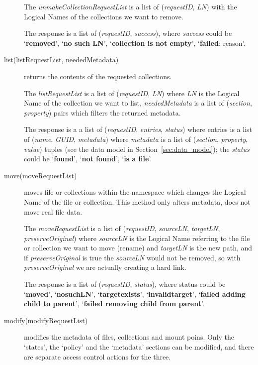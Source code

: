 \documentclass{book}
\begin{document}
\begin{description}
    The \emph{unmakeCollectionRequestList} is a list of (\emph{requestID}, \emph{LN}) with the Logical Names of the collections we want to remove. 

    The response is a list of (\emph{requestID}, \emph{success}), where \emph{success} could be `\textbf{removed}', `\textbf{no such LN}', `\textbf{collection is not empty}', `\textbf{failed}: reason'.
    
    \item[list(listRequestList, neededMetadata)] returns the contents of the requested collections.
        
    The \emph{listRequestList} is a list of (\emph{requestID}, \emph{LN}) where \emph{LN} is the Logical Name of the collection we want to list, \emph{neededMetadata} is a list of (\emph{section}, \emph{property}) pairs which filters the returned metadata.
    
    The response is a a list of (\emph{requestID}, \emph{entries}, \emph{status}) where entries is a list of (\emph{name}, \emph{GUID}, \emph{metadata}) where \emph{metadata} is a list of (\emph{section}, \emph{property}, \emph{value}) tuples (see the data model in Section~\ref{sec:data_model}); the \emph{status} could be `\textbf{found}', `\textbf{not found}', `\textbf{is a file}'.
    
    \item[move(moveRequestList)] moves file or collections within the namespace which changes the Logical Name of the file or collection. This method only alters metadata, does not move real file data.

    The \emph{moveRequestList} is a list of (\emph{requestID}, \emph{sourceLN}, \emph{targetLN}, \emph{preserveOriginal}) where \emph{sourceLN} is the Logical Name referring to the file or collection we want to move (rename) and \emph{targetLN} is the new path, and if \emph{preserveOriginal} is true the \emph{sourceLN} would not be removed, so with \emph{preserveOriginal} we are actually creating a hard link.
    
    The response is a list of (\emph{requestID}, \emph{status}), where status could be `\textbf{moved}', `\textbf{nosuchLN}', `\textbf{targetexists}', `\textbf{invalidtarget}', `\textbf{failed adding child to parent}', `\textbf{failed removing child from parent}'.
    
    \item[modify(modifyRequestList)] modifies the metadata of files, collections and mount poins. Only the `states', the `policy' and the `metadata' sections can be modified, and there are separate access control actions for the three.
    

\end{description}
\end{document}
